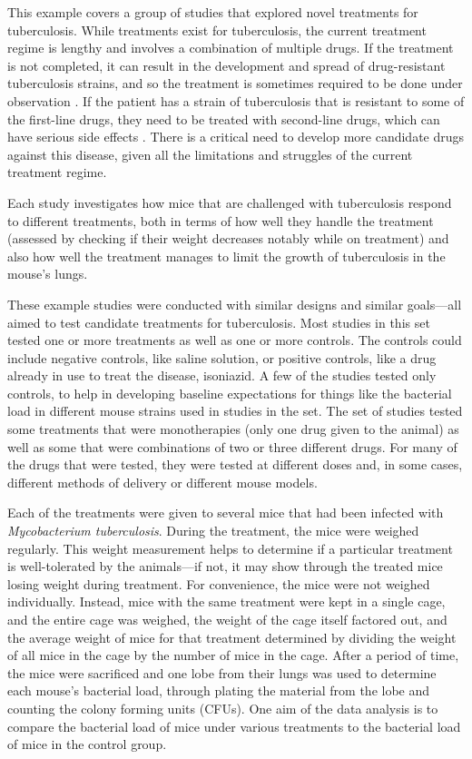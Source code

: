 \documentclass[]{tufte-book}
\begin{document}
This example covers a group of studies that explored novel
treatments for tuberculosis. While treatments exist for tuberculosis, the
current treatment regime is lengthy and involves a combination of multiple
drugs. If the treatment is not completed, it can result in the development and
spread of drug-resistant tuberculosis strains, and so the treatment is sometimes
required to be done under observation \citep{barry2009new}. If the patient has a
strain of tuberculosis that is resistant to some of the first-line drugs, they
need to be treated with second-line drugs, which can have serious side effects
\citep{barry2009new}. There is a critical need to develop more candidate drugs
against this disease, given all the limitations and struggles of the current
treatment regime.

Each study investigates how mice that are challenged with tuberculosis respond
to different treatments, both in terms of how well they handle the treatment
(assessed by checking if their weight decreases notably while on treatment) and
also how well the treatment manages to limit the growth of tuberculosis in the
mouse's lungs.

These example studies were conducted with similar designs and similar
goals---all aimed to test candidate treatments for tuberculosis. Most studies in
this set tested one or more treatments as well as one or more controls. The
controls could include negative controls, like saline solution, or positive
controls, like a drug already in use to treat the disease, isoniazid. A few of
the studies tested only controls, to help in developing baseline expectations
for things like the bacterial load in different mouse strains used in studies in
the set. The set of studies tested some treatments that were monotherapies (only
one drug given to the animal) as well as some that were combinations of two or
three different drugs. For many of the drugs that were tested, they were tested
at different doses and, in some cases, different methods of delivery or
different mouse models.

Each of the treatments were given to several mice that had been infected with
\emph{Mycobacterium tuberculosis}. During the treatment, the mice were weighed
regularly. This weight measurement helps to determine if a particular treatment
is well-tolerated by the animals---if not, it may show through the treated mice
losing weight during treatment. For convenience, the mice were not weighed
individually. Instead, mice with the same treatment were kept in a single cage,
and the entire cage was weighed, the weight of the cage itself factored out, and
the average weight of mice for that treatment determined by dividing the weight
of all mice in the cage by the number of mice in the cage. After a period of
time, the mice were sacrificed and one lobe from their lungs was used to
determine each mouse's bacterial load, through plating the material from the
lobe and counting the colony forming units (CFUs). One aim of the data analysis
is to compare the bacterial load of mice under various treatments to the
bacterial load of mice in the control group.
\end{document}
